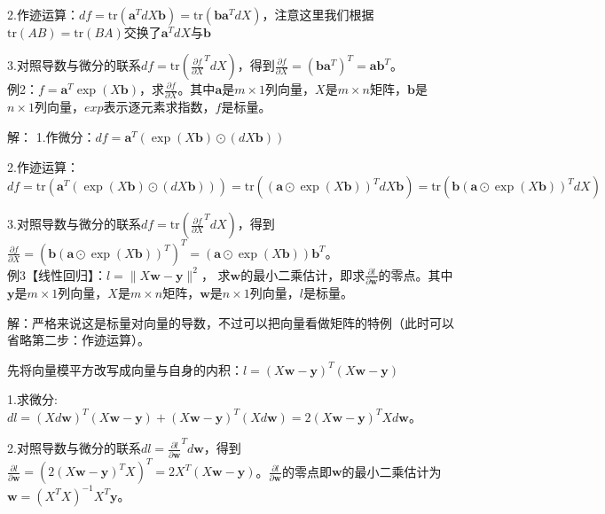 \documentclass[UTF8]{ctexart}
\begin{document}
		2.作迹运算：$df = \text{tr}(\boldsymbol{a}^TdX\boldsymbol{b}) = \text{tr}(\boldsymbol{b}\boldsymbol{a}^TdX)$，注意这里我们根据$\text{tr}(AB) = \text{tr}(BA)交换了\boldsymbol{a}^TdX与\boldsymbol{b}$

		3.对照导数与微分的联系$df = \text{tr}\left(\frac{\partial f}{\partial X}^T dX\right)$，得到$\frac{\partial f}{\partial X} = (\boldsymbol{b}\boldsymbol{a}^T)^T= \boldsymbol{a}\boldsymbol{b}^T$。\\

		\noindent 例2：$f = \boldsymbol{a}^T \exp(X\boldsymbol{b})$，求$\frac{\partial f}{\partial X}$。其中$\boldsymbol{a}$是$m×1$列向量，$X$是$m\times n$矩阵，$\boldsymbol{b}$是$n×1$列向量，$exp$表示逐元素求指数，$f$是标量。

		\noindent 解：
		1.作微分：$df = \boldsymbol{a}^T(\exp(X\boldsymbol{b})\odot (dX\boldsymbol{b}))$

		2.作迹运算：$df = \text{tr}( \boldsymbol{a}^T(\exp(X\boldsymbol{b})\odot (dX\boldsymbol{b}))) =\text{tr}((\boldsymbol{a}\odot \exp(X\boldsymbol{b}))^TdX \boldsymbol{b}) = \text{tr}(\boldsymbol{b}(\boldsymbol{a}\odot \exp(X\boldsymbol{b}))^TdX)$

		3.对照导数与微分的联系$df = \text{tr}\left(\frac{\partial f}{\partial X}^T dX\right)$，得到$\frac{\partial f}{\partial X} = (\boldsymbol{b}(\boldsymbol{a}\odot \exp(X\boldsymbol{b}))^T)^T= (\boldsymbol{a}\odot \exp(X\boldsymbol{b}))\boldsymbol{b}^T$。\\

		\noindent 例3【线性回归】：$l = \|X\boldsymbol{w}- \boldsymbol{y}\|^2$， 求$\boldsymbol{w}$的最小二乘估计，即求$\frac{\partial l}{\partial \boldsymbol{w}}$的零点。其中$\boldsymbol{y}$是$m×1$列向量，$X$是$m\times n$矩阵，$\boldsymbol{w}$是$n×1$列向量，$l$是标量。

		\noindent 解：严格来说这是标量对向量的导数，不过可以把向量看做矩阵的特例（此时可以省略第二步：作迹运算）。

		先将向量模平方改写成向量与自身的内积：$l = (X\boldsymbol{w}- \boldsymbol{y})^T(X\boldsymbol{w}- \boldsymbol{y})$

		1.求微分:$dl = (Xd\boldsymbol{w})^T(X\boldsymbol{w}-\boldsymbol{y})+(X\boldsymbol{w}-\boldsymbol{y})^T(Xd\boldsymbol{w}) = 2(X\boldsymbol{w}-\boldsymbol{y})^TXd\boldsymbol{w}$。

		2.对照导数与微分的联系$dl = \frac{\partial l}{\partial \boldsymbol{w}}^Td\boldsymbol{w}$，得到$\frac{\partial l}{\partial \boldsymbol{w}}= (2(X\boldsymbol{w}-\boldsymbol{y})^TX)^T = 2X^T(X\boldsymbol{w}-\boldsymbol{y})$。$\frac{\partial l}{\partial \boldsymbol{w}}$的零点即$\boldsymbol{w}$的最小二乘估计为$\boldsymbol{w} = (X^TX)^{-1}X^T\boldsymbol{y}$。\\
\end{document}
